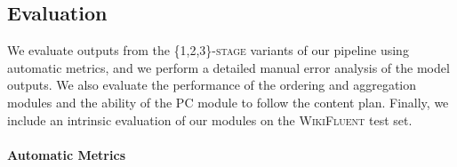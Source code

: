 \subsection{Evaluation}
\label{sec:pipeline:eval}
We evaluate outputs from the \textsc{\{1,2,3\}-stage} variants of our pipeline using automatic metrics, and we perform a detailed manual error analysis of the model outputs. We also evaluate the performance of the ordering and aggregation modules and the ability of the PC module to follow the content plan. Finally, we include an intrinsic evaluation of our modules on the \textsc{WikiFluent} test set.


\paragraph{Automatic Metrics}


